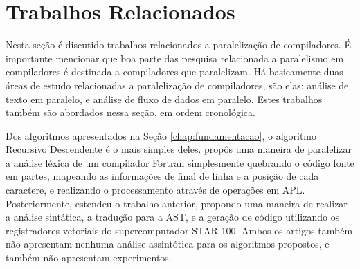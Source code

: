 
\newcommand{\sla}{\textbackslash}

\newcommand{\cmd}[1]{\textsf{#1}}

\newcommand{\pkg}[1]{\textsf{#1}}

\newcommand{\ltxcmd}[1]{\cmd{\sla{}#1}}

\chapter{Trabalhos Relacionados}
\label{chap:related_works}

Nesta seção é discutido trabalhos relacionados a paralelização de compiladores.
É importante mencionar que boa parte das pesquisa relacionada a paralelismo
em compiladores é destinada a compiladores que paralelizam. Há basicamente
duas áreas de estudo relacionadas a paralelização de compiladores, são
elas: análise de texto em paralelo, e análise de fluxo de dados em paralelo.
Estes trabalhos também são abordados nessa seção, em ordem cronológica.

Dos algoritmos apresentados na Seção \ref{chap:fundamentacao}, o algoritmo
Recursivo Descendente é o mais simples deles. \cite{Lincoln:1970:PPT:987475.987478}
propôs uma maneira de paralelizar a análise léxica de um compilador
Fortran simplesmente quebrando o código fonte em partes, mapeando as
informações de final de
linha e a posição de cada caractere, e realizando o processamento
através de operações em APL.
Posteriormente, \cite{Krohn:1975:PAC:390015.808414} estendeu o trabalho
anterior, propondo uma maneira de realizar a análise sintática, a
tradução para a AST, e a geração
de código utilizando os registradores vetoriais do supercomputador
STAR-100. Ambos os artigos também não apresentam nenhuma
análise assintótica para os algoritmos propostos, e também não apresentam
experimentos. 

